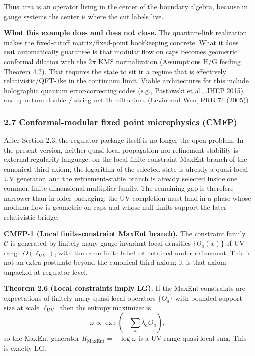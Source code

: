 Thus area is an operator living in the center of the boundary algebra, because in gauge systems the center is where the cut labels live.

\textbf{What this example does and does not close.} The quantum-link realization makes the fixed-cutoff matrix/fixed-point bookkeeping concrete. What it does \textbf{not} automatically guarantee is that modular flow on caps becomes geometric conformal dilation with the \(2\pi\) KMS normalization (Assumptions H/G feeding Theorem 4.2). That requires the state to sit in a regime that is effectively relativistic/QFT-like in the continuum limit. Viable architectures for this include holographic quantum error-correcting codes (e.g., \href{https://arxiv.org/abs/1503.06237}{Pastawski et al., JHEP 2015}) and quantum double / string-net Hamiltonians (\href{https://link.aps.org/doi/10.1103/PhysRevB.71.045110}{Levin and Wen, PRB 71 (2005)}).

\subsubsection{2.7 Conformal-modular fixed point microphysics (CMFP)}\label{27-conformal-modular-fixed-point-microphysics-cmfp}

After Section 2.3, the regulator package itself is no longer the open problem. In the present version, neither quasi-local propagation nor refinement stability is external regularity language: on the local finite-constraint MaxEnt branch of the canonical third axiom, the logarithm of the selected state is already a quasi-local UV generator, and the refinement-stable branch is already selected inside one common finite-dimensional multiplier family. The remaining gap is therefore narrower than in older packaging: the UV completion must land in a phase whose modular flow is geometric on caps and whose null limits support the later relativistic bridge.

\textbf{CMFP-1 (Local finite-constraint MaxEnt branch).} The constraint family \(\mathcal{C}\) is generated by finitely many gauge-invariant local densities \(\{O_a(x)\}\) of UV range \(O(\ell_{\mathrm{UV}})\), with the same finite label set retained under refinement. This is not an extra postulate beyond the canonical third axiom; it is that axiom unpacked at regulator level.

\textbf{Theorem 2.6 (Local constraints imply LG).} If the MaxEnt constraints are expectations of finitely many quasi-local operators \(\{O_a\}\) with bounded support size at scale \(\ell_{\mathrm{UV}}\), then the entropy maximizer is
\[
\omega \propto \exp\left(-\sum_a \lambda_a O_a\right),
\]
so the MaxEnt generator \(H_{\mathrm{MaxEnt}}=-\log\omega\) is a UV-range quasi-local sum. This is exactly LG.

